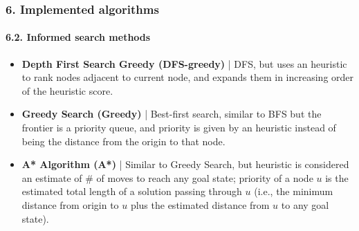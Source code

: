 \documentclass{beamer}
\begin{document}
\begin{frame}
\frametitle{6. Implemented algorithms}
\framesubtitle{6.2. Informed search methods}

\begin{itemize}  
  \item \textbf{Depth First Search Greedy (DFS-greedy)} | DFS, but uses an heuristic to rank nodes adjacent to current node, and expands them in increasing order of the heuristic score.
  \item \textbf{Greedy Search (Greedy)} | Best-first search, similar to BFS but the frontier is a priority queue, and priority is given by an heuristic instead of being the distance from the origin to that node.
  \item \textbf{A* Algorithm (A*)} | Similar to Greedy Search, but heuristic is considered an estimate of \# of moves to reach any goal state; priority of a node $u$ is the estimated total length of a solution passing through $u$ (i.e., the minimum distance from origin to $u$ plus the estimated distance from $u$ to any goal state).
\end{itemize}
\end{frame}
\end{document}
